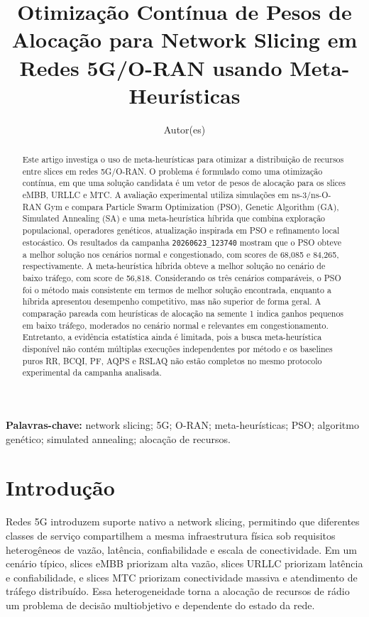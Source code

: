 \documentclass[12pt,a4paper]{article}
\title{Otimização Contínua de Pesos de Alocação para Network Slicing em Redes 5G/O-RAN usando Meta-Heurísticas}
\author{Autor(es)}
\date{}
\begin{document}
\maketitle

\begin{abstract}
Este artigo investiga o uso de meta-heurísticas para otimizar a distribuição de recursos entre slices em redes 5G/O-RAN. O problema é formulado como uma otimização contínua, em que uma solução candidata é um vetor de pesos de alocação para os slices eMBB, URLLC e MTC. A avaliação experimental utiliza simulações em ns-3/ns-O-RAN Gym e compara Particle Swarm Optimization (PSO), Genetic Algorithm (GA), Simulated Annealing (SA) e uma meta-heurística híbrida que combina exploração populacional, operadores genéticos, atualização inspirada em PSO e refinamento local estocástico. Os resultados da campanha \texttt{20260623\_123740} mostram que o PSO obteve a melhor solução nos cenários normal e congestionado, com scores de 68,085 e 84,265, respectivamente. A meta-heurística híbrida obteve a melhor solução no cenário de baixo tráfego, com score de 56,818. Considerando os três cenários comparáveis, o PSO foi o método mais consistente em termos de melhor solução encontrada, enquanto a híbrida apresentou desempenho competitivo, mas não superior de forma geral. A comparação pareada com heurísticas de alocação na semente 1 indica ganhos pequenos em baixo tráfego, moderados no cenário normal e relevantes em congestionamento. Entretanto, a evidência estatística ainda é limitada, pois a busca meta-heurística disponível não contém múltiplas execuções independentes por método e os baselines puros RR, BCQI, PF, AQPS e RSLAQ não estão completos no mesmo protocolo experimental da campanha analisada.
\end{abstract}

\noindent\textbf{Palavras-chave:} network slicing; 5G; O-RAN; meta-heurísticas; PSO; algoritmo genético; simulated annealing; alocação de recursos.

\section{Introdução}

Redes 5G introduzem suporte nativo a network slicing, permitindo que diferentes classes de serviço compartilhem a mesma infraestrutura física sob requisitos heterogêneos de vazão, latência, confiabilidade e escala de conectividade. Em um cenário típico, slices eMBB priorizam alta vazão, slices URLLC priorizam latência e confiabilidade, e slices MTC priorizam conectividade massiva e atendimento de tráfego distribuído. Essa heterogeneidade torna a alocação de recursos de rádio um problema de decisão multiobjetivo e dependente do estado da rede.
\end{document}
